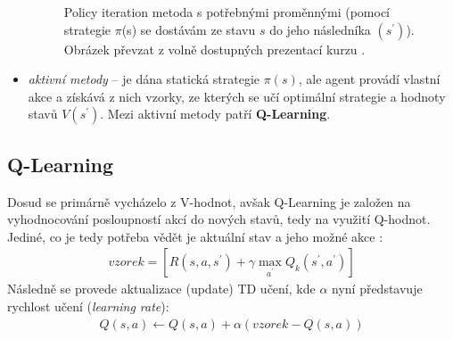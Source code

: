 \begin{itemize}
  \begin{figure}[!htbp]
  \begin{center}
    \caption{Policy iteration metoda s potřebnými proměnnými (pomocí strategie $\pi$(s) se dostávám ze stavu $s$ do jeho následníka $(s^\prime)$). Obrázek převzat z volně dostupných prezentací kurzu \cite{berkeley}.}
    \label{img:policyeval}
  \end{center}
  \end{figure}

  \item \textit{aktivní metody} -- je dána statická strategie $\pi(s)$, ale agent provádí vlastní akce a získává z nich vzorky, ze kterých se učí optimální strategie a hodnoty stavů $V(s^\prime)$. Mezi aktivní metody patří \textbf{Q-Learning}.
\end{itemize}

\subsection*{Q-Learning}
Dosud se primárně vycházelo z V-hodnot, avšak Q-Learning je založen na vyhodnocování posloupností akcí do nových stavů, tedy na využití Q-hodnot. Jediné, co je tedy potřeba vědět je aktuální stav a jeho možné akce \cite{RLIntro}:
\begin{align}
vzorek = \left [ R(s,a,s^\prime)+\gamma \max_{a^\prime}Q_{k}(s^\prime,a^\prime) \right]
\end{align}
Následně se provede aktualizace (update) TD učení, kde $\alpha$ nyní představuje rychlost učení (\textit{learning rate}):
\begin{align}
 Q(s,a) \leftarrow  Q(s,a) + \alpha(vzorek - Q(s,a))
\end{align}


